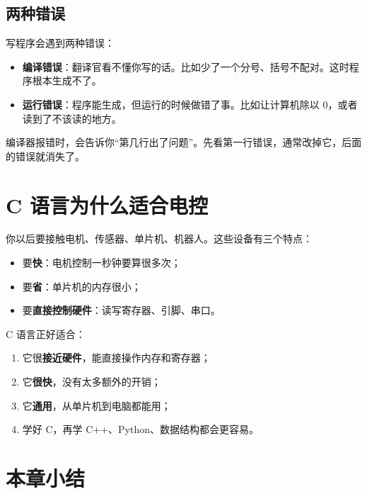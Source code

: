 \subsection{两种错误}

写程序会遇到两种错误：

\begin{itemize}
  \item \textbf{编译错误}：翻译官看不懂你写的话。比如少了一个分号、括号不配对。这时程序根本生成不了。
  \item \textbf{运行错误}：程序能生成，但运行的时候做错了事。比如让计算机除以 0，或者读到了不该读的地方。
\end{itemize}

\begin{tipbox}[报错不可怕]
编译器报错时，会告诉你“第几行出了问题”。先看第一行错误，通常改掉它，后面的错误就消失了。
\end{tipbox}

\section{C 语言为什么适合电控}

你以后要接触电机、传感器、单片机、机器人。这些设备有三个特点：

\begin{itemize}
  \item 要\textbf{快}：电机控制一秒钟要算很多次；
  \item 要\textbf{省}：单片机的内存很小；
  \item 要\textbf{直接控制硬件}：读写寄存器、引脚、串口。
\end{itemize}

C 语言正好适合：

\begin{enumerate}
  \item 它很\textbf{接近硬件}，能直接操作内存和寄存器；
  \item 它\textbf{很快}，没有太多额外的开销；
  \item 它\textbf{通用}，从单片机到电脑都能用；
  \item 学好 C，再学 C++、Python、数据结构都会更容易。
\end{enumerate}

\section{本章小结}


